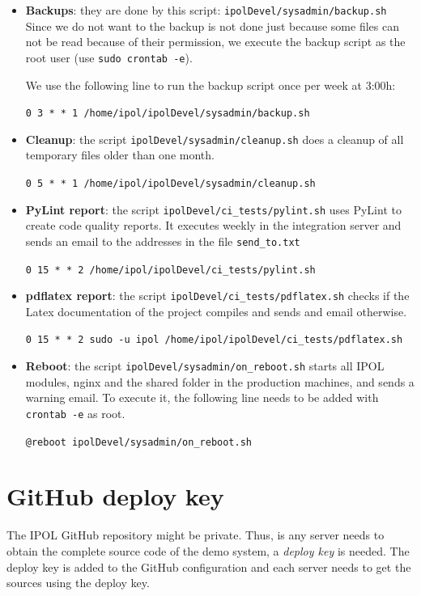 \documentclass[a4paper,12pt]{article}
\begin{document}
\begin{itemize}
    \item \textbf{Backups}: they are done by this script: {\tt ipolDevel/sysadmin/backup.sh}
Since we do not want to the backup is not done just because some files can not be read because of their permission, we execute the backup script as the root user (use {\tt sudo crontab -e}).

We use the following line to run the backup script once per week at 3:00h:

    {\tt 0 3 * * 1 /home/ipol/ipolDevel/sysadmin/backup.sh}

    \item \textbf{Cleanup}: the script {\tt ipolDevel/sysadmin/cleanup.sh} does a cleanup of all temporary files older than one month.

    {\tt 0 5 * * 1 /home/ipol/ipolDevel/sysadmin/cleanup.sh}

    \item \textbf{PyLint report}: the script {\tt ipolDevel/ci\_tests/pylint.sh} uses PyLint to create code quality reports. It executes weekly in the integration server and sends an email to the addresses in the file {\tt send\_to.txt}

    {\tt 0 15 * * 2 /home/ipol/ipolDevel/ci\_tests/pylint.sh}

    \item \textbf{pdflatex report}: the script {\tt ipolDevel/ci\_tests/pdflatex.sh} checks if the Latex documentation of the project compiles and sends and email otherwise.

    {\tt 0 15 * * 2 sudo -u ipol /home/ipol/ipolDevel/ci\_tests/pdflatex.sh}

    \item \textbf{Reboot}: the script {\tt ipolDevel/sysadmin/on\_reboot.sh} starts all IPOL modules, nginx and the shared folder in the production machines, and sends a warning email. To execute it, the following line needs to be added with {\tt crontab -e} as root.

    {\tt @reboot ipolDevel/sysadmin/on\_reboot.sh}
\end{itemize}

\section{GitHub deploy key}
The IPOL GitHub repository might be private. Thus, is any server needs to obtain the complete source code of the demo system, a \emph{deploy key} is needed. The deploy key is added to the GitHub configuration and each server needs to get the sources using the deploy key.
\end{document}
